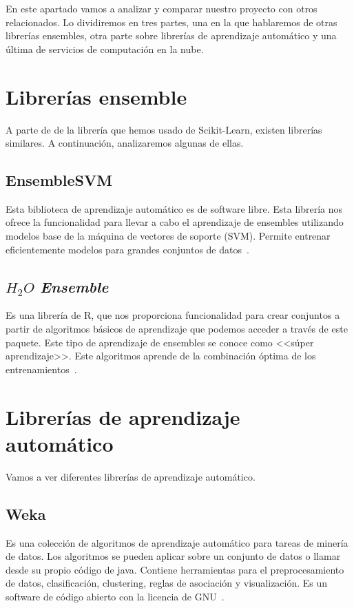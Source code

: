En este apartado vamos a analizar y comparar nuestro proyecto con otros relacionados. Lo dividiremos en tres partes, una en la que hablaremos de otras librerías ensembles, otra parte sobre librerías de aprendizaje automático y una última de servicios de computación en la nube.

\section{Librerías ensemble}
A parte de de la librería que hemos usado de Scikit-Learn, existen librerías similares. A continuación, analizaremos algunas de ellas.

\subsection{EnsembleSVM}
Esta biblioteca de aprendizaje automático es de software libre. Esta librería nos ofrece la funcionalidad para llevar a cabo el aprendizaje de ensembles utilizando modelos base de la máquina de vectores de soporte (SVM). Permite entrenar eficientemente modelos para grandes conjuntos de datos~\cite{ensembleSVM}.

\subsection{$H_2O$ \textit{Ensemble}}
Es una librería de R, que nos proporciona funcionalidad para crear conjuntos a partir de algoritmos básicos de aprendizaje que podemos acceder a través de este paquete. Este tipo de aprendizaje de ensembles se conoce como <<súper aprendizaje>>. Este algoritmos aprende de la combinación óptima de los entrenamientos~\cite{ensembleh2o}.

\section{Librerías de aprendizaje automático}
Vamos a ver diferentes librerías de aprendizaje automático.
\subsection{Weka}
Es una colección de algoritmos de aprendizaje automático para tareas de minería de datos. Los algoritmos se pueden aplicar sobre un conjunto de datos o llamar desde su propio código de java. Contiene herramientas para el preprocesamiento de datos, clasificación, clustering, reglas de asociación y visualización. Es un software de código abierto con la licencia de GNU~\cite{weka}. 

